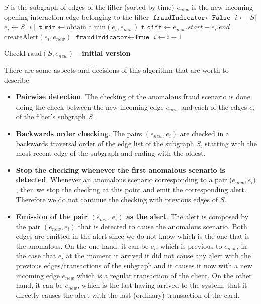 \begin{algorithm}[H]
    \small
    \begin{algorithmic}[1]
    \REQUIRE $S$ is the subgraph of edges of the filter (sorted by time)
    \REQUIRE $e_{new}$ is the new incoming opening interaction edge belonging to the filter 
    \STATE $\texttt{fraudIndicator} \gets \texttt{False}$
    \STATE $i \gets |S|$
      \STATE $e_i \gets S[i]$
      \STATE $\texttt{t\_min} \gets \text{obtain\_t\_min}(e_i, e_{new})$
      \STATE $\texttt{t\_diff} \gets e_{new}.start - e_i.end$
        \STATE $\text{createAlert}(e_i, e_{new})$
        \STATE $\texttt{fraudIndicator} \gets \texttt{True}$
      \ENDIF
      \STATE $i \gets i - 1$
    \ENDWHILE
    \end{algorithmic}
    \caption{$\text{CheckFraud}(S, e_{new})$ -- \textbf{initial version}}
    \label{alg:check-fraud-1}
\end{algorithm}

There are some aspects and decisions of this algorithm that are worth to describe:

\begin{itemize}
    \item \textbf{Pairwise detection}. The checking of the anomalous fraud scenario is done doing the check between the new incoming edge $e_{new}$ and each of the edges $e_i$ of the filter's subgraph $S$.
    \item \textbf{Backwards order checking}. The pairs $(e_{new}, e_i)$ are checked in a backwards traversal order of the edge list of the subgraph $S$, starting with the most recent edge of the subgraph and ending with the oldest.  
    \item \textbf{Stop the checking whenever the first anomalous scenario is detected}. Whenever an anomalous scenario corresponding to a pair ($e_{new}, e_i)$, then we stop the checking at this point and emit the corresponding alert. Therefore we do not continue the checking with previous edges of $S$. 
    \item \textbf{Emission of the pair $(e_{new}, e_i)$ as the alert}. The alert is composed by the pair $(e_{new}, e_i)$ that is detected to cause the anomalous scenario. Both edges are emitted in the alert since we do not know which is the one that is the anomalous. On the one hand, it can be $e_i$, which is previous to $e_{new}$, in the case that $e_i$ at the moment it arrived it did not cause any alert with the previous edges/transactions of the subgraph and it causes it now with a new incoming edge $e_{new}$ which is a regular transaction of the client. On the other hand, it can be $e_{new}$, which is the last having arrived to the system, that it directly causes the alert with the last (ordinary) transaction of the card.
\end{itemize}

